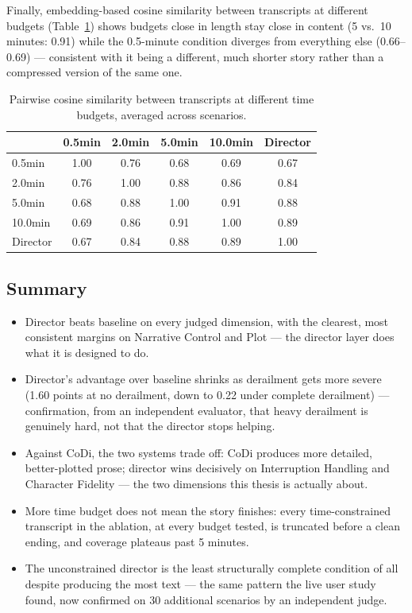 \documentclass[10pt]{article}
\begin{document}
Finally, embedding-based cosine similarity between transcripts at different budgets (Table~\ref{tab:llm-time-sim}) shows budgets close in length stay close in content (5 vs.\ 10 minutes: 0.91) while the 0.5-minute condition diverges from everything else (0.66--0.69) — consistent with it being a different, much shorter story rather than a compressed version of the same one.

\begin{table}[htbp]
\centering
\caption{Pairwise cosine similarity between transcripts at different time budgets, averaged across scenarios.}
\label{tab:llm-time-sim}
\begin{tabular}{lccccc}
\toprule
 & 0.5min & 2.0min & 5.0min & 10.0min & Director \\
\midrule
0.5min    & 1.00 & 0.76 & 0.68 & 0.69 & 0.67 \\
2.0min    & 0.76 & 1.00 & 0.88 & 0.86 & 0.84 \\
5.0min    & 0.68 & 0.88 & 1.00 & 0.91 & 0.88 \\
10.0min   & 0.69 & 0.86 & 0.91 & 1.00 & 0.89 \\
Director  & 0.67 & 0.84 & 0.88 & 0.89 & 1.00 \\
\bottomrule
\end{tabular}
\end{table}

\subsection{Summary}
\label{sec:llm-summary}

\begin{itemize}
\item Director beats baseline on every judged dimension, with the clearest, most consistent margins on Narrative Control and Plot — the director layer does what it is designed to do.
\item Director's advantage over baseline shrinks as derailment gets more severe (1.60 points at no derailment, down to 0.22 under complete derailment) — confirmation, from an independent evaluator, that heavy derailment is genuinely hard, not that the director stops helping.
\item Against CoDi, the two systems trade off: CoDi produces more detailed, better-plotted prose; director wins decisively on Interruption Handling and Character Fidelity — the two dimensions this thesis is actually about.
\item More time budget does not mean the story finishes: every time-constrained transcript in the ablation, at every budget tested, is truncated before a clean ending, and coverage plateaus past 5 minutes.
\item The unconstrained director is the least structurally complete condition of all despite producing the most text — the same pattern the live user study found, now confirmed on 30 additional scenarios by an independent judge.
\end{itemize}
\end{document}
